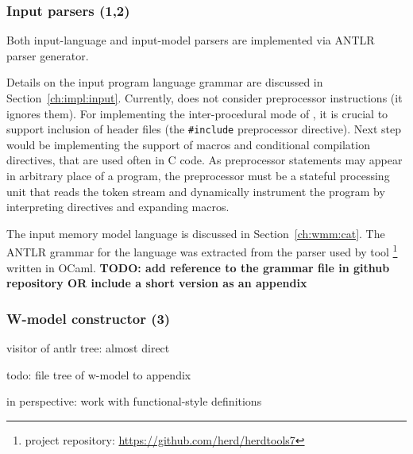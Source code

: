 
\subsubsection{Input parsers (1,2)}
\label{ch:impl:proc:input-parser}

Both input-language and input-model parsers are implemented via ANTLR parser generator.

Details on the input program language grammar are discussed in Section~\ref{ch:impl:input}.
Currently, \porthos[2] does not consider preprocessor instructions (it ignores them).
For implementing the inter-procedural mode of \porthos{}, it is crucial to support inclusion of header files (the \texttt{\#include} preprocessor directive).
Next step would be implementing the support of macros and conditional compilation directives, that are used often in C code.
As preprocessor statements may appear in arbitrary place of a program, the preprocessor must be a stateful processing unit that reads the token stream and dynamically instrument the program by interpreting directives and expanding macros.

The input memory model language \cat is discussed in Section~\ref{ch:wmm:cat}.
The ANTLR grammar for the \cat language was extracted from the parser used by  tool%
\footnote{ project repository: \url{https://github.com/herd/herdtools7}} %
written in OCaml.
\textbf{TODO: add reference to the grammar file in github repository OR include a short version as an appendix}



\subsubsection{W-model constructor (3)}
\label{ch:impl:proc:w-constr}


visitor of antlr tree: almost direct

todo: file tree of w-model to appendix

in perspective: work with functional-style definitions


